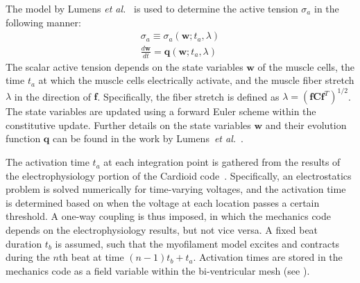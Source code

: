The model by Lumens \textit{et al.}~\cite{lumens_2009} is used to determine the active tension $\sigma_a$ in the following manner:
\begin{align}
\sigma_a \equiv \sigma_a(\bm{w}; t_a, \lambda) \\
\frac{d\bm{w}}{dt} = \bm{q}(\bm{w}; t_a, \lambda)
\end{align}
The scalar active tension depends on the state variables $\bm{w}$ of the muscle cells, the time $t_a$ at which the muscle cells electrically activate, and the muscle fiber stretch $\lambda$ in the direction of $\bm{f}$. Specifically, the fiber stretch is defined as $\lambda = (\bm{f}\bm{C}\bm{f}^T)^{1/2}$. The state variables are updated using a forward Euler scheme within the constitutive update. Further details on the state variables $\bm{w}$ and their evolution function $\bm{q}$ can be found in the work by Lumens~\textit{et al.}~\cite{lumens_2009}.

The activation time $t_a$ at each integration point is gathered from the results of the electrophysiology portion of the Cardioid code~\cite{richards_2013}. Specifically, an electrostatics problem is solved numerically for time-varying voltages, and the activation time is determined based on when the voltage at each location passes a certain threshold. A one-way coupling is thus imposed, in which the mechanics code depends on the electrophysiology results, but not vice versa. A fixed beat duration $t_b$ is assumed, such that the myofilament model excites and contracts during the $n$th beat at time $(n-1)t_b + t_a$. Activation times are stored in the mechanics code as a field variable within the bi-ventricular mesh (see ).

